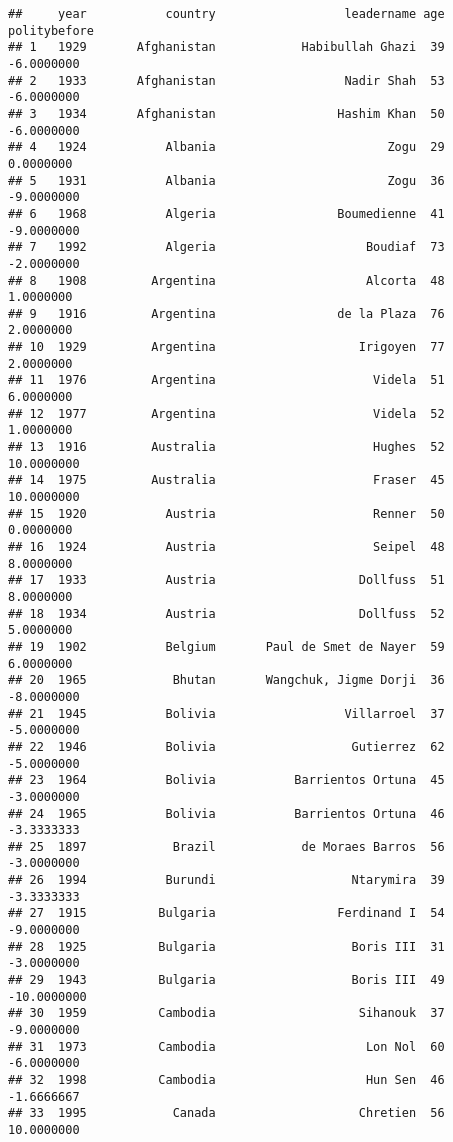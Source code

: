 \documentclass[
]{article}
\begin{document}
\begin{verbatim}
##     year           country                  leadername age politybefore
## 1   1929       Afghanistan            Habibullah Ghazi  39   -6.0000000
## 2   1933       Afghanistan                  Nadir Shah  53   -6.0000000
## 3   1934       Afghanistan                 Hashim Khan  50   -6.0000000
## 4   1924           Albania                        Zogu  29    0.0000000
## 5   1931           Albania                        Zogu  36   -9.0000000
## 6   1968           Algeria                 Boumedienne  41   -9.0000000
## 7   1992           Algeria                     Boudiaf  73   -2.0000000
## 8   1908         Argentina                     Alcorta  48    1.0000000
## 9   1916         Argentina                 de la Plaza  76    2.0000000
## 10  1929         Argentina                    Irigoyen  77    2.0000000
## 11  1976         Argentina                      Videla  51    6.0000000
## 12  1977         Argentina                      Videla  52    1.0000000
## 13  1916         Australia                      Hughes  52   10.0000000
## 14  1975         Australia                      Fraser  45   10.0000000
## 15  1920           Austria                      Renner  50    0.0000000
## 16  1924           Austria                      Seipel  48    8.0000000
## 17  1933           Austria                    Dollfuss  51    8.0000000
## 18  1934           Austria                    Dollfuss  52    5.0000000
## 19  1902           Belgium       Paul de Smet de Nayer  59    6.0000000
## 20  1965            Bhutan       Wangchuk, Jigme Dorji  36   -8.0000000
## 21  1945           Bolivia                  Villarroel  37   -5.0000000
## 22  1946           Bolivia                   Gutierrez  62   -5.0000000
## 23  1964           Bolivia           Barrientos Ortuna  45   -3.0000000
## 24  1965           Bolivia           Barrientos Ortuna  46   -3.3333333
## 25  1897            Brazil            de Moraes Barros  56   -3.0000000
## 26  1994           Burundi                   Ntarymira  39   -3.3333333
## 27  1915          Bulgaria                 Ferdinand I  54   -9.0000000
## 28  1925          Bulgaria                   Boris III  31   -3.0000000
## 29  1943          Bulgaria                   Boris III  49  -10.0000000
## 30  1959          Cambodia                    Sihanouk  37   -9.0000000
## 31  1973          Cambodia                     Lon Nol  60   -6.0000000
## 32  1998          Cambodia                     Hun Sen  46   -1.6666667
## 33  1995            Canada                    Chretien  56   10.0000000

\end{verbatim}
\end{document}
